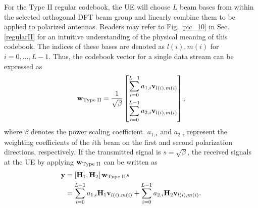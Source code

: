 \documentclass[lettersize,journal]{IEEEtran}
\begin{document}
For the Type II regular codebook, the UE will choose $L$ beam bases from within the selected orthogonal DFT beam group and linearly combine them to be applied to polarized antennas.  Readers may refer to Fig. \ref{pic_10} in Sec. \ref{regularII} for an intuitive understanding of the physical meaning of this codebook.  The indices of these bases are denoted as  $l(i),m(i)$ for $i=0,\ldots,L-1$. Thus, the codebook vector for a single data stream can be expressed as 
\begin{equation}
 {{\bf{w}}_{{\rm{Type \;II}}}} = \frac{1}{{\sqrt \beta  }}\left[ {\begin{aligned}
{\sum\limits_{i = 0}^{L - 1} {{a_{1,i}}{{\bf{v}}_{l(i),m(i)}}} }\\
{\sum\limits_{i = 0}^{L - 1} {{a_{2,i}}{{\bf{v}}_{l(i),m(i)}}}}
\end{aligned}} \right],
\end{equation}
where $\beta$ denotes the power scaling coefficient. $a_{1,i}$ and $a_{2,i}$ represent the weighting coefficients of the $i$th beam on the first and second polarization directions, respectively. If the transmitted signal is $s={\sqrt{\beta}}$, the received signals at the UE by applying ${{\bf{w}}_{{\rm{Type \;II}}}}$ can be written as 
\begin{equation}
\begin{aligned}\label{regy}
{\bf{y}} &= \left[ {{{\bf{H}}_1},{{\bf{H}}_2}} \right]{{\bf{w}}_{{\rm{Type \; II}}}}s\\
 &= \sum\limits_{i = 0}^{L - 1} {{a_{1,i}}{{\bf{H}}_1}{{\bf{v}}_{l(i),m(i)}}}  + \sum\limits_{i = 0}^{L - 1} {{a_{2,i}}{{\bf{H}}_2}{{\bf{v}}_{l(i),m(i)}}} .
\end{aligned}
\end{equation} 
\end{document}
